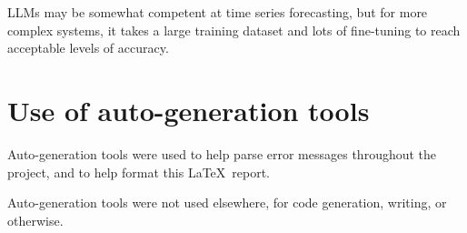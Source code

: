 \documentclass[11pt,a4paper]{article}
\begin{document}
LLMs may be somewhat competent at time series forecasting, but for more complex systems, it takes a large training dataset and lots of fine-tuning to reach acceptable levels of accuracy.
\clearpage


\appendix
\section{Use of auto-generation tools}
Auto-generation tools were used to help parse error messages throughout the project, and to help format this \LaTeX\ report.

Auto-generation tools were not used elsewhere, for code generation, writing, or otherwise.
\end{document}
